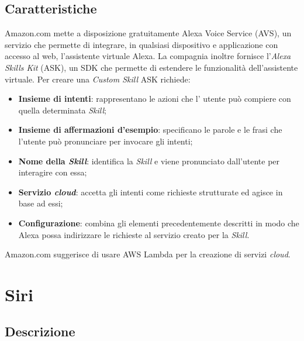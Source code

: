 \documentclass[a4paper,titlepage]{article}
\begin{document}
	\subsection{Caratteristiche}
		Amazon.com mette a disposizione gratuitamente Alexa Voice Service (AVS), un servizio che permette di integrare, in qualsiasi dispositivo e applicazione con accesso al web, l'assistente virtuale Alexa. La compagnia inoltre fornisce l'\textit{Alexa Skills Kit} (ASK), un SDK che permette di estendere le funzionalità dell'assistente virtuale. Per creare una \textit{Custom Skill} ASK richiede:
		\begin{itemize}
			\item \textbf{Insieme di intenti}: rappresentano le azioni che l' utente può compiere con quella determinata \textit{Skill}; 
			\item \textbf{Insieme di affermazioni d'esempio}: specificano le parole e le frasi che l'utente può pronunciare per invocare gli intenti;
			\item \textbf{Nome della \textit{Skill}}: identifica la \textit{Skill} e viene pronunciato dall'utente per interagire con essa;
			\item \textbf{Servizio \textit{cloud}}: accetta gli intenti come richieste strutturate ed agisce in base ad essi;
			\item \textbf{Configurazione}: combina gli elementi precedentemente descritti in modo che Alexa possa indirizzare le richieste al servizio creato per la \textit{Skill}.
			
		\end{itemize}
	Amazon.com suggerisce di usare AWS Lambda per la creazione di servizi \textit{cloud}.
		
	
\newpage	
	\section{Siri}
	\subsection{Descrizione}
	
\end{document}
